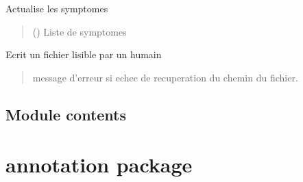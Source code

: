 \documentclass[letterpaper,10pt,english]{sphinxmanual}
\begin{document}
\begin{fulllineitems}
\begin{fulllineitems}
\label{\detokenize{frise:frise.save.save.set_symptomes}}
\pysigstartsignatures
{}
\pysigstopsignatures
\sphinxAtStartPar
Actualise les symptomes
\begin{quote}\begin{description}
\sphinxAtStartPar
{} () \textendash{} Liste de symptomes

\end{description}\end{quote}

\end{fulllineitems}


\begin{fulllineitems}
\label{\detokenize{frise:frise.save.save.write_report}}
\pysigstartsignatures
{}
\pysigstopsignatures
\sphinxAtStartPar
Ecrit un fichier lisible par un humain
\begin{quote}\begin{description}
\sphinxAtStartPar
{} \textendash{} message d’erreur si echec de recuperation du chemin du fichier.

\end{description}\end{quote}

\end{fulllineitems}


\end{fulllineitems}



\section{Module contents}
\label{\detokenize{frise:module-frise}}\label{\detokenize{frise:module-contents}}
\sphinxstepscope


\chapter{annotation package}
\label{\detokenize{annotation:annotation-package}}\label{\detokenize{annotation::doc}}
\end{document}
